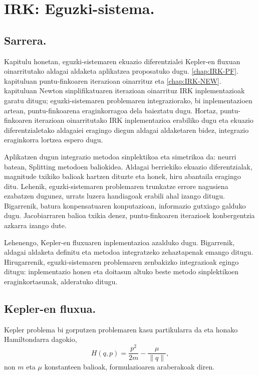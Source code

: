 \chapter{IRK: Eguzki-sistema.}


\section{Sarrera.}
  

Kapitulu honetan, eguzki-sistemaren ekuazio diferentzialei Kepler-en fluxuan oinarritutako aldagai aldaketa aplikatzea proposatuko dugu. \ref{chap:IRK-PF}. kapituluan puntu-finkoaren iterazioan oinarrituz eta \ref{chap:IRK-NEW}. kapituluan Newton sinplifikatuaren iterazioan oinarrituz IRK inplementazioak garatu ditugu; eguzki-sistemaren problemaren integraziorako, bi inplementazioen artean, puntu-finkoarena eraginkorragoa dela baieztatu dugu. Hortaz, puntu-finkoaren iterazioan oinarritutako IRK inplementazioa erabiliko dugu eta  ekuazio diferentzialetako aldagaiei eragingo diegun aldagai aldaketaren bidez, integrazio eraginkorra lortzea espero dugu.  

Aplikatzen dugun integrazio metodoa sinplektikoa eta simetrikoa da: neurri batean, Splitting metodoen baliokidea. Aldagai berriekiko ekuazio diferentzialak, magnitude txikiko balioak hartzen dituzte eta honek, hiru abantaila eragingo ditu. Lehenik, eguzki-sistemaren problemaren trunkatze errore nagusiena ezabatzen dugunez, urrats luzera handiagoak erabili ahal izango ditugu. Bigarrenik, batura konpensatuaren konputazioan, informazio gutxiago galduko dugu. Jacobiarraren balioa txikia denez, puntu-finkoaren iterazioek konbergentzia azkarra izango dute. 

Lehenengo, Kepler-en fluxuaren inplementazioa azalduko dugu. Bigarrenik, aldagai aldaketa definitu eta metodoa integratzeko zehaztapenak emango ditugu. Hirugarrenik, eguzki-sistemaren problemaren zenbakizko integrazioak egingo ditugu: inplementazio honen eta doitasun altuko beste metodo sinplektikoen eraginkortasunak, alderatuko ditugu.     

 

\section{Kepler-en fluxua.}
   
   
Kepler problema bi gorputzen problemaren kasu partikularra da eta  honako Hamiltondarra dagokio,
\begin{equation}
\label{eq: hamkepler}
H(q,p)=\frac{p^2}{2m}-\frac{\mu}{\|q\|},
\end{equation}
non $m$ eta $\mu$ konstanteen balioak, formulazioaren araberakoak diren.

